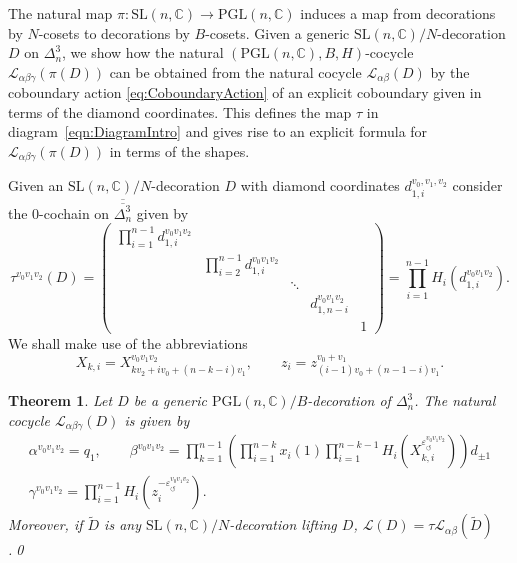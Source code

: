 \documentclass[12pt]{amsart}
\newtheorem{theorem}{Theorem}[section]
\theoremstyle{definition}
\numberwithin{equation}{section}
\def\SL{\mathrm{SL}}
\def\PGL{\mathrm{PGL}}
\def\C{\mathbb{C}}
\begin{document}
The natural map $\pi\colon\SL(n,\C)\to\PGL(n,\C)$ induces a map from decorations by $N$-cosets to decorations by $B$-cosets. Given a generic $\SL(n,\C)/N$-decoration $D$ on $\Delta_n^3$, we show how the natural $(\PGL(n,\C),B,H)$-cocycle $\mathcal L_{\alpha\beta\gamma}(\pi(D))$ can be obtained from the natural cocycle $\mathcal L_{\alpha\beta}(D)$ by the coboundary action \eqref{eq:CoboundaryAction} of an explicit coboundary given in terms of the diamond coordinates. This defines the map $\tau$ in diagram~\eqref{eqn:DiagramIntro} and gives rise to an explicit formula for $\mathcal L_{\alpha\beta\gamma}(\pi(D))$ in terms of the shapes.




Given an $\SL(n,\C)/N$-decoration $D$ with diamond coordinates $d^{v_0,v_1,v_2}_{1,i}$ consider the $0$-cochain on $\overline{\overline{\Delta^3_n}}$ given by
\begin{equation}
\tau^{v_0v_1v_2}(D) = \begin{pmatrix}\prod_{i=1}^{n-1} d^{v_0v_1v_2}_{1,i} \\ & \prod_{i=2}^{n-1} d^{v_0v_1v_2}_{1,i} \\ & & \ddots \\ & & & d^{v_0v_1v_2}_{1,n-i} \\ & & & & 1\end{pmatrix}=\prod_{i=1}^{n-1}H_i(d^{v_0v_1v_2}_{1,i}).%
\end{equation}
We shall make use of the abbreviations
\begin{equation}
X_{k,i}=X_{kv_2+iv_0+(n-k-i)v_1}^{v_0v_1v_2},\qquad z_i=z_{(i-1)v_0+(n-1-i)v_1}^{v_0+v_1}.
\end{equation}

\begin{theorem}\label{thm:NaturalCocycleShapes}
Let $D$ be a generic $\PGL(n,\C)/B$-decoration of $\Delta^3_n$. The natural cocycle $\mathcal L_{\alpha\beta\gamma}(D)$ is given by
\begin{equation}\label{eq:NaturalCocycleFormula}
\begin{gathered}
\alpha^{v_0v_1v_2}=q_1,\qquad \beta^{v_0v_1v_2}=\prod_{k=1}^{n-1}\left(\prod_{i=1}^{n-k}x_i(1)\prod_{i=1}^{n-k-1}H_i(X_{k,i}^{\varepsilon^{v_0v_1v_2}_\circlearrowleft})\right)d_{\pm 1}\\
\gamma^{v_0v_1v_2}=\prod_{i=1}^{n-1}H_i(z_{i}^{-\varepsilon_\circlearrowleft^{v_0v_1v_2}}).
\end{gathered}
\end{equation}
Moreover, if $\widetilde D$ is any $\SL(n,\C)/N$-decoration lifting $D$, $\mathcal L(D)=\tau \mathcal L_{\alpha\beta}(\widetilde D)$.\qed
\end{theorem}
\end{document}
